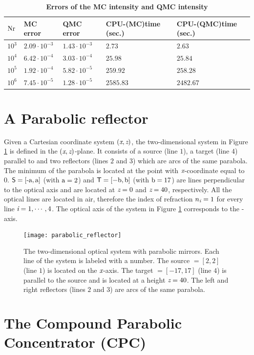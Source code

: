 \begin{table}[h!] \label{tab:table_tir_triangulation}
\centering
\caption{\bf Errors of the MC intensity and QMC intensity}
\begin{tabular}{lllll}
 \hline  $\textrm{Nr}$\;  & MC error & QMC error & CPU-(MC)time (sec.) & CPU-(QMC)time (sec.)\\
  \hline 
 $10^3$ & $2.09\cdot 10^{-3}$  & $1.43\cdot10^{-3}$  & $2.73$  & $2.63$  \\
$10^4$  & $6.42\cdot 10^{-4}$  & $3.03\cdot 10^{-4}$  & $25.98$  & $25.84$   \\
$10^5$  & $1.92\cdot 10^{-4}$  & $5.82\cdot 10^{-5}$  & $259.92$  & $258.28$  \\
 $10^6$  & $7.45\cdot 10^{-5}$  & $1.28\cdot 10^{-5}$  & $2585.83$ & $2482.67$  \\
 \hline
 \end{tabular}
 \label{tab:qmc_error_triangulation}
 \end{table}


\section{A Parabolic reflector}

Given a Cartesian coordinate system  $(\textit{x},\textit{z})$, the two-dimensional system in Figure \ref{CPC} is defined in the $(\textit{x},\textit{z})$-plane.
 It consists of a source  (line $1$), a target  (line $4$) parallel to  and two reflectors (lines $2$ and $3$) which are arcs of the same parabola. 
  The minimum of the parabola is located at the point with $\textit{x}$-coordinate equal to $0$. $\textsf{S}=[\textrm{-a}, \textrm{a}]$ (with $\textrm{a}=2$) and $\textsf{T}=[-\textrm{b},\textrm{b}]$ (with $\textrm{b}=17$) are lines perpendicular to the optical axis and are located at $\textit{z}=0$ and $\textit{z}=40$, respectively.
All the optical lines are located in air, therefore the index of refraction ${n}_{\textit{i}}=1$ for every line $\textit{i}=1, \cdots, 4$.
The optical axis of the system in Figure \ref{CPC} corresponds to the -axis.
\begin{figure}[h!]
\centering
\texttt{[image: parabolic\_reflector]}
\caption{The two-dimensional optical system with parabolic mirrors.  Each line of the system is labeled with a number.
   The source $= [2,2]$ (line $1$) is located on the $\textit{x}$-axis.
   The target $= [-17, 17]$ (line $4$) is parallel to the source and is located at a height $ \textit{z}= 40$.
   The left and right reflectors (lines $2$ and $3$) are arcs of the same parabola.}
\label{CPC}
\end{figure}



\section{The Compound Parabolic Concentrator (CPC)}